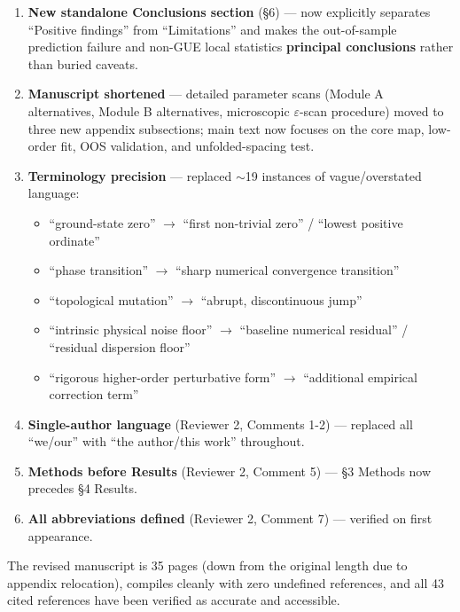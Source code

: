 \documentclass[11pt]{article}
\begin{document}
\begin{enumerate}
\item \textbf{New standalone Conclusions section} (\S6) --- now explicitly separates ``Positive findings'' from ``Limitations'' and makes the out-of-sample prediction failure and non-GUE local statistics \textbf{principal conclusions} rather than buried caveats.

\item \textbf{Manuscript shortened} --- detailed parameter scans (Module A alternatives, Module B alternatives, microscopic $\varepsilon$-scan procedure) moved to three new appendix subsections; main text now focuses on the core map, low-order fit, OOS validation, and unfolded-spacing test.

\item \textbf{Terminology precision} --- replaced $\sim$19 instances of vague/overstated language:
\begin{itemize}[leftmargin=2em]
\item ``ground-state zero'' $\to$ ``first non-trivial zero'' / ``lowest positive ordinate''
\item ``phase transition'' $\to$ ``sharp numerical convergence transition''
\item ``topological mutation'' $\to$ ``abrupt, discontinuous jump''
\item ``intrinsic physical noise floor'' $\to$ ``baseline numerical residual'' / ``residual dispersion floor''
\item ``rigorous higher-order perturbative form'' $\to$ ``additional empirical correction term''
\end{itemize}

\item \textbf{Single-author language} (Reviewer 2, Comments 1-2) --- replaced all ``we/our'' with ``the author/this work'' throughout.

\item \textbf{Methods before Results} (Reviewer 2, Comment 5) --- \S3 Methods now precedes \S4 Results.

\item \textbf{All abbreviations defined} (Reviewer 2, Comment 7) --- verified on first appearance.
\end{enumerate}

\noindent The revised manuscript is 35 pages (down from the original length due to appendix relocation), compiles cleanly with zero undefined references, and all 43 cited references have been verified as accurate and accessible.
\end{document}
